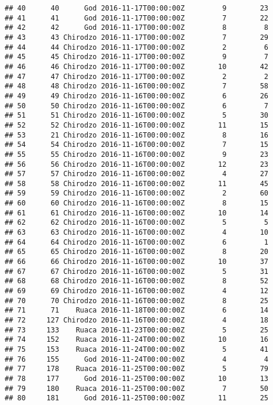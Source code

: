 \documentclass[
]{article}
\begin{document}
\begin{verbatim}
## 40      40      God 2016-11-17T00:00:00Z         9        23
## 41      41      God 2016-11-17T00:00:00Z         7        22
## 42      42      God 2016-11-17T00:00:00Z         8         8
## 43      43 Chirodzo 2016-11-17T00:00:00Z         7        29
## 44      44 Chirodzo 2016-11-17T00:00:00Z         2         6
## 45      45 Chirodzo 2016-11-17T00:00:00Z         9         7
## 46      46 Chirodzo 2016-11-17T00:00:00Z        10        42
## 47      47 Chirodzo 2016-11-17T00:00:00Z         2         2
## 48      48 Chirodzo 2016-11-16T00:00:00Z         7        58
## 49      49 Chirodzo 2016-11-16T00:00:00Z         6        26
## 50      50 Chirodzo 2016-11-16T00:00:00Z         6         7
## 51      51 Chirodzo 2016-11-16T00:00:00Z         5        30
## 52      52 Chirodzo 2016-11-16T00:00:00Z        11        15
## 53      21 Chirodzo 2016-11-16T00:00:00Z         8        16
## 54      54 Chirodzo 2016-11-16T00:00:00Z         7        15
## 55      55 Chirodzo 2016-11-16T00:00:00Z         9        23
## 56      56 Chirodzo 2016-11-16T00:00:00Z        12        23
## 57      57 Chirodzo 2016-11-16T00:00:00Z         4        27
## 58      58 Chirodzo 2016-11-16T00:00:00Z        11        45
## 59      59 Chirodzo 2016-11-16T00:00:00Z         2        60
## 60      60 Chirodzo 2016-11-16T00:00:00Z         8        15
## 61      61 Chirodzo 2016-11-16T00:00:00Z        10        14
## 62      62 Chirodzo 2016-11-16T00:00:00Z         5         5
## 63      63 Chirodzo 2016-11-16T00:00:00Z         4        10
## 64      64 Chirodzo 2016-11-16T00:00:00Z         6         1
## 65      65 Chirodzo 2016-11-16T00:00:00Z         8        20
## 66      66 Chirodzo 2016-11-16T00:00:00Z        10        37
## 67      67 Chirodzo 2016-11-16T00:00:00Z         5        31
## 68      68 Chirodzo 2016-11-16T00:00:00Z         8        52
## 69      69 Chirodzo 2016-11-16T00:00:00Z         4        12
## 70      70 Chirodzo 2016-11-16T00:00:00Z         8        25
## 71      71    Ruaca 2016-11-18T00:00:00Z         6        14
## 72     127 Chirodzo 2016-11-16T00:00:00Z         4        18
## 73     133    Ruaca 2016-11-23T00:00:00Z         5        25
## 74     152    Ruaca 2016-11-24T00:00:00Z        10        16
## 75     153    Ruaca 2016-11-24T00:00:00Z         5        41
## 76     155      God 2016-11-24T00:00:00Z         4         4
## 77     178    Ruaca 2016-11-25T00:00:00Z         5        79
## 78     177      God 2016-11-25T00:00:00Z        10        13
## 79     180    Ruaca 2016-11-25T00:00:00Z         7        50
## 80     181      God 2016-11-25T00:00:00Z        11        25

\end{verbatim}
\end{document}
